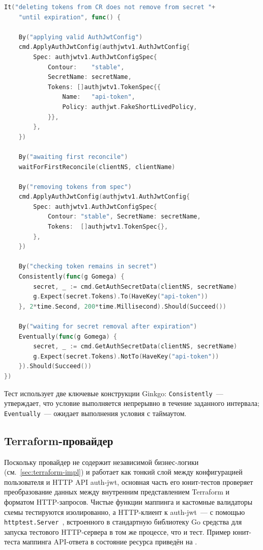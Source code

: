 \begin{codeblock}
\begin{lstlisting}[language=Go]
It("deleting tokens from CR does not remove from secret "+
    "until expiration", func() {

    By("applying valid AuthJwtConfig")
    cmd.ApplyAuthJwtConfig(authjwtv1.AuthJwtConfig{
        Spec: authjwtv1.AuthJwtConfigSpec{
            Contour:    "stable",
            SecretName: secretName,
            Tokens: []authjwtv1.TokenSpec{{
                Name:   "api-token",
                Policy: authjwt.FakeShortLivedPolicy,
            }},
        },
    })

    By("awaiting first reconcile")
    waitForFirstReconcile(clientNS, clientName)

    By("removing tokens from spec")
    cmd.ApplyAuthJwtConfig(authjwtv1.AuthJwtConfig{
        Spec: authjwtv1.AuthJwtConfigSpec{
            Contour: "stable", SecretName: secretName,
            Tokens:  []authjwtv1.TokenSpec{},
        },
    })

    By("checking token remains in secret")
    Consistently(func(g Gomega) {
        secret, _ := cmd.GetAuthSecretData(clientNS, secretName)
        g.Expect(secret.Tokens).To(HaveKey("api-token"))
    }, 2*time.Second, 200*time.Millisecond).Should(Succeed())

    By("waiting for secret removal after expiration")
    Eventually(func(g Gomega) {
        secret, _ := cmd.GetAuthSecretData(clientNS, secretName)
        g.Expect(secret.Tokens).NotTo(HaveKey("api-token"))
    }).Should(Succeed())
})
\end{lstlisting}
\end{codeblock}

Тест использует две ключевые конструкции Ginkgo:
\texttt{Consistently}~--- утверждает, что условие выполняется
непрерывно в течение заданного интервала;
\texttt{Eventually}~--- ожидает выполнения условия с таймаутом.

\subsection{Terraform-провайдер}\label{subsec:ch4-terraform-tests}

Поскольку провайдер не содержит независимой бизнес-логики
(см.~\ref{sec:terraform-impl})
и работает как тонкий слой между конфигурацией пользователя
и HTTP API auth-jwt, основная часть его юнит-тестов
проверяет преобразование данных между внутренним представлением
Terraform и форматом HTTP-запросов.
Чистые функции маппинга и кастомные валидаторы схемы
тестируются изолированно, а HTTP-клиент к auth-jwt~---
с помощью \texttt{httptest.Server}~\cite{GoHttptest},
встроенного в стандартную библиотеку Go средства
для запуска тестового HTTP-сервера в том же процессе, что и тест.
Пример юнит-теста маппинга API-ответа в состояние ресурса
приведён на .

